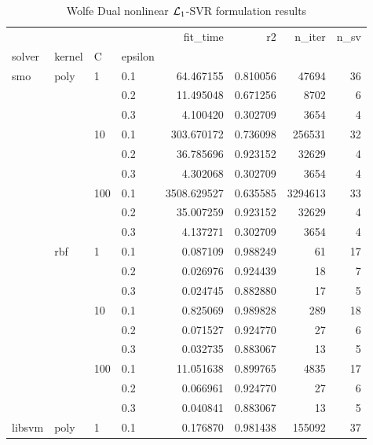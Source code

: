 \begin{table}[H]
\centering
\caption{Wolfe Dual nonlinear $\protect \mathcal{L}_1$-SVR formulation results}
\label{nonlinear_dual_l1_svr_cv_results}
\begin{tabular}{llllrrrr}
\toprule
       &     &     &     &     fit\_time &        r2 &    n\_iter &  n\_sv \\
solver & kernel & C & epsilon &              &           &           &       \\
\midrule
smo & poly & 1   & 0.1 &    64.467155 &  0.810056 &     47694 &    36 \\
       &     &     & 0.2 &    11.495048 &  0.671256 &      8702 &     6 \\
       &     &     & 0.3 &     4.100420 &  0.302709 &      3654 &     4 \\
       &     & 10  & 0.1 &   303.670172 &  0.736098 &    256531 &    32 \\
       &     &     & 0.2 &    36.785696 &  0.923152 &     32629 &     4 \\
       &     &     & 0.3 &     4.302068 &  0.302709 &      3654 &     4 \\
       &     & 100 & 0.1 &  3508.629527 &  0.635585 &   3294613 &    33 \\
       &     &     & 0.2 &    35.007259 &  0.923152 &     32629 &     4 \\
       &     &     & 0.3 &     4.137271 &  0.302709 &      3654 &     4 \\
       & rbf & 1   & 0.1 &     0.087109 &  0.988249 &        61 &    17 \\
       &     &     & 0.2 &     0.026976 &  0.924439 &        18 &     7 \\
       &     &     & 0.3 &     0.024745 &  0.882880 &        17 &     5 \\
       &     & 10  & 0.1 &     0.825069 &  0.989828 &       289 &    18 \\
       &     &     & 0.2 &     0.071527 &  0.924770 &        27 &     6 \\
       &     &     & 0.3 &     0.032735 &  0.883067 &        13 &     5 \\
       &     & 100 & 0.1 &    11.051638 &  0.899765 &      4835 &    17 \\
       &     &     & 0.2 &     0.066961 &  0.924770 &        27 &     6 \\
       &     &     & 0.3 &     0.040841 &  0.883067 &        13 &     5 \\
libsvm & poly & 1   & 0.1 &     0.176870 &  0.981438 &    155092 &    37 \\

\end{tabular}
\end{table}
